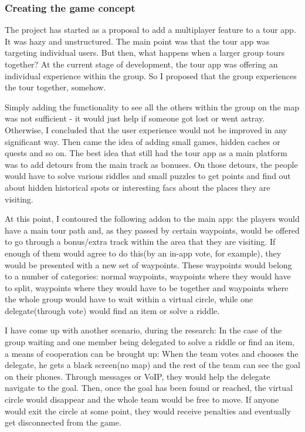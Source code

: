 \documentclass{article}
\begin{document}
\subsubsection{Creating the game concept}

The project has started as a proposal to add a multiplayer feature to a tour
app. It was hazy and unstructured. The main point was that the tour app was
targeting individual users. But then, what happens when a larger group tours
together? At the current stage of development, the tour app was offering an
individual experience within the group. So I proposed that the group experiences
the tour together, somehow. \newline

Simply adding the functionality to see all the others within the group on the
map was not sufficient - it would just help if someone got lost or went astray.
Otherwise, I concluded that the user experience would not be improved in any
significant way. Then came the idea of adding small games, hidden caches or
quests and so on. The best idea that still had the tour app as a main platform
was to add detours from the main track as bonuses. On those detours, the people
would have to solve various riddles and small puzzles to get points and find out
about hidden historical spots or interesting facs about the places they are
visiting. \newline

At this point, I contoured the following addon to the main app: the players
would have a main tour path and, as they passed by certain waypoints, would be
offered to go through a bonus/extra track within the area that they are
visiting. If enough of them would agree to do this(by an in-app vote, for
example), they would be presented with a new set of waypoints. These waypoints
would belong to a number of categories: normal waypoints, waypoints where they
would have to split, waypoints where they would have to be together and
waypoints where the whole group would have to wait within a virtual circle,
while one delegate(through vote) would find an item or solve a riddle.\newline

I have come up with another scenario, during the research: In the case of the
group waiting and one member being delegated to solve a riddle or find an item,
a means of cooperation can be brought up: When the team votes and chooses the
delegate, he gets a black screen(no map) and the rest of the team can see
the goal on their phones. Through messages or VoIP, they would help the delegate
navigate to the goal. Then, once the goal has been found or reached, the virtual
circle would disappear and the whole team would be free to move. If anyone would
exit the circle at some point, they would receive penalties and eventually get
disconnected from the game.\newline
\end{document}
